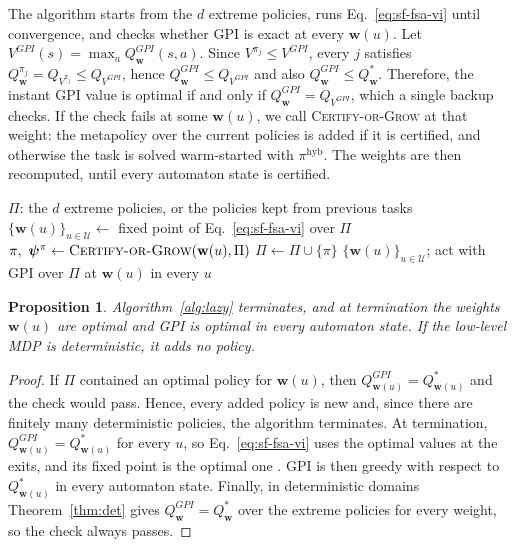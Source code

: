 \documentclass[11pt]{article}
\newcommand{\vpsi}{\bm{\psi}}      %
\newtheorem{proposition}{Proposition}
\begin{document}
The algorithm starts from the $d$ extreme policies, runs Eq.~\eqref{eq:sf-fsa-vi} until convergence, and checks whether GPI is exact at every $\mathbf{w}(u)$. Let $V^{GPI}(s) = \max_a Q^{GPI}_{\mathbf{w}}(s,a)$. Since $V^{\pi_j} \leq V^{GPI}$, every $j$ satisfies $Q^{\pi_j}_{\mathbf{w}} = Q_{V^{\pi_j}} \leq Q_{V^{GPI}}$, hence $Q^{GPI}_{\mathbf{w}} \leq Q_{V^{GPI}}$ and also $Q^{GPI}_{\mathbf{w}} \leq Q^*_{\mathbf{w}}$. Therefore, the instant GPI value is optimal if and only if $Q^{GPI}_{\mathbf{w}} = Q_{V^{GPI}}$, which a single backup checks. If the check fails at some $\mathbf{w}(u)$, we call \textsc{Certify-or-Grow} at that weight: the metapolicy over the current policies is added if it is certified, and otherwise the task is solved warm-started with $\pi^{\mathrm{hyb}}$. The weights are then recomputed, until every automaton state is certified.

\begin{algorithm}[H]
\caption{\textsc{Lazy SF-FSA-VI}$(\Pi)$}\label{alg:lazy}
\begin{algorithmic}[1]
\Require $\Pi$: the $d$ extreme policies, or the policies kept from previous tasks
\Repeat
    \State $\{\mathbf{w}(u)\}_{u \in \mathcal{U}} \gets$ fixed point of Eq.~\eqref{eq:sf-fsa-vi} over $\Pi$
     
        \State $\pi,\ \vpsi^{\pi} \gets \textsc{Certify-or-Grow}(\mathbf{w}(u), \Pi)$ 
        \State $\Pi \gets \Pi \cup \{\pi\}$
    \EndFor
{}
\State \Return $\{\mathbf{w}(u)\}_{u \in \mathcal{U}}$; act with GPI over $\Pi$ at $\mathbf{w}(u)$ in every $u$
\end{algorithmic}
\end{algorithm}

\begin{proposition}\label{prop:lazy}
    Algorithm~\ref{alg:lazy} terminates, and at termination the weights $\mathbf{w}(u)$ are optimal and GPI is optimal in every automaton state. If the low-level MDP is deterministic, it adds no policy.
\end{proposition}

\begin{proof}
    If $\Pi$ contained an optimal policy for $\mathbf{w}(u)$, then $Q^{GPI}_{\mathbf{w}(u)} = Q^*_{\mathbf{w}(u)}$ and the check would pass. Hence, every added policy is new and, since there are finitely many deterministic policies, the algorithm terminates. At termination, $Q^{GPI}_{\mathbf{w}(u)} = Q^*_{\mathbf{w}(u)}$ for every $u$, so Eq.~\eqref{eq:sf-fsa-vi} uses the optimal values at the exits, and its fixed point is the optimal one \cite{kuric_planning_2024}. GPI is then greedy with respect to $Q^*_{\mathbf{w}(u)}$ in every automaton state. Finally, in deterministic domains Theorem~\ref{thm:det} gives $Q^{GPI}_{\mathbf{w}} = Q^*_{\mathbf{w}}$ over the extreme policies for every weight, so the check always passes.
\end{proof}
\end{document}
